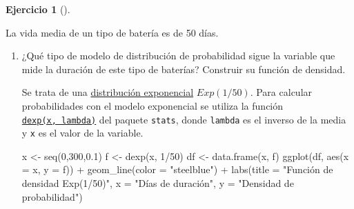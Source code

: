 \documentclass[
  a4paper,
]{scrreport}
\newenvironment{Shaded}{\begin{snugshade}}{\end{snugshade}}
\newcommand{\AttributeTok}[1]{\textcolor[rgb]{0.40,0.45,0.13}{#1}}
\newcommand{\DecValTok}[1]{\textcolor[rgb]{0.68,0.00,0.00}{#1}}
\newcommand{\FloatTok}[1]{\textcolor[rgb]{0.68,0.00,0.00}{#1}}
\newcommand{\FunctionTok}[1]{\textcolor[rgb]{0.28,0.35,0.67}{#1}}
\newcommand{\NormalTok}[1]{\textcolor[rgb]{0.00,0.23,0.31}{#1}}
\newcommand{\OtherTok}[1]{\textcolor[rgb]{0.00,0.23,0.31}{#1}}
\newcommand{\SpecialCharTok}[1]{\textcolor[rgb]{0.37,0.37,0.37}{#1}}
\newcommand{\StringTok}[1]{\textcolor[rgb]{0.13,0.47,0.30}{#1}}
\theoremstyle{definition}
\newtheorem{exercise}{Ejercicio}[chapter]
\theoremstyle{remark}
\begin{document}
\begin{exercise}[]\protect\hypertarget{exr-distribuciones-probabilidad-5}{}\label{exr-distribuciones-probabilidad-5}

La vida media de un tipo de batería es de 50 días.

\begin{enumerate}
\def\labelenumi{\alph{enumi}.}
\item
  ¿Qué tipo de modelo de distribución de probabilidad sigue la variable
  que mide la duración de este tipo de baterías? Construir su función de
  densidad.

  \begin{tcolorbox}[enhanced jigsaw, breakable, toptitle=1mm, colbacktitle=quarto-callout-tip-color!10!white, rightrule=.15mm, opacityback=0, opacitybacktitle=0.6, titlerule=0mm, coltitle=black, colframe=quarto-callout-tip-color-frame, colback=white, bottomtitle=1mm, leftrule=.75mm, toprule=.15mm, title=\textcolor{quarto-callout-tip-color}{\faLightbulb}\hspace{0.5em}{Solución}, arc=.35mm, bottomrule=.15mm, left=2mm]

  Se trata de una
  \href{https://es.wikipedia.org/wiki/Distribuci\%C3\%B3n_exponencial}{distribución
  exponencial} \(Exp(1/50)\). Para calcular probabilidades con el modelo
  exponencial se utiliza la función
  \href{https://www.rdocumentation.org/packages/stats/versions/3.3/topics/Exponential}{\texttt{dexp(x,\ lambda)}}
  del paquete \texttt{stats}, donde \texttt{lambda} es el inverso de la
  media y \texttt{x} es el valor de la variable.

\begin{Shaded}
\begin{Highlighting}[]
\NormalTok{x }\OtherTok{\textless{}{-}} \FunctionTok{seq}\NormalTok{(}\DecValTok{0}\NormalTok{,}\DecValTok{300}\NormalTok{,}\FloatTok{0.1}\NormalTok{)}
\NormalTok{f }\OtherTok{\textless{}{-}} \FunctionTok{dexp}\NormalTok{(x, }\DecValTok{1}\SpecialCharTok{/}\DecValTok{50}\NormalTok{)}
\NormalTok{df }\OtherTok{\textless{}{-}} \FunctionTok{data.frame}\NormalTok{(x, f)}
\FunctionTok{ggplot}\NormalTok{(df, }\FunctionTok{aes}\NormalTok{(}\AttributeTok{x =}\NormalTok{ x, }\AttributeTok{y =}\NormalTok{ f)) }\SpecialCharTok{+}
    \FunctionTok{geom\_line}\NormalTok{(}\AttributeTok{color =} \StringTok{"steelblue"}\NormalTok{) }\SpecialCharTok{+}
    \FunctionTok{labs}\NormalTok{(}\AttributeTok{title =} \StringTok{"Función de densidad Exp(1/50)"}\NormalTok{, }\AttributeTok{x =} \StringTok{"Días de duración"}\NormalTok{, }\AttributeTok{y =} \StringTok{"Densidad de probabilidad"}\NormalTok{)}
\end{Highlighting}
\end{Shaded}


\end{tcolorbox}
\end{enumerate}
\end{exercise}
\end{document}
